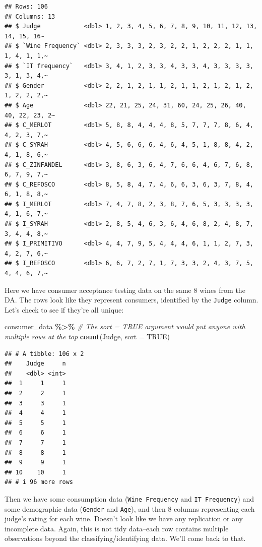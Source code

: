 \documentclass[
]{book}
\newenvironment{Shaded}{\begin{snugshade}}{\end{snugshade}}
\newcommand{\AttributeTok}[1]{\textcolor[rgb]{0.13,0.29,0.53}{#1}}
\newcommand{\CommentTok}[1]{\textcolor[rgb]{0.56,0.35,0.01}{\textit{#1}}}
\newcommand{\ConstantTok}[1]{\textcolor[rgb]{0.56,0.35,0.01}{#1}}
\newcommand{\FunctionTok}[1]{\textcolor[rgb]{0.13,0.29,0.53}{\textbf{#1}}}
\newcommand{\NormalTok}[1]{#1}
\newcommand{\SpecialCharTok}[1]{\textcolor[rgb]{0.81,0.36,0.00}{\textbf{#1}}}
\begin{document}
\begin{verbatim}
## Rows: 106
## Columns: 13
## $ Judge            <dbl> 1, 2, 3, 4, 5, 6, 7, 8, 9, 10, 11, 12, 13, 14, 15, 16~
## $ `Wine Frequency` <dbl> 2, 3, 3, 3, 2, 3, 2, 2, 1, 2, 2, 2, 1, 1, 1, 4, 1, 1,~
## $ `IT frequency`   <dbl> 3, 4, 1, 2, 3, 3, 4, 3, 3, 4, 3, 3, 3, 3, 3, 1, 3, 4,~
## $ Gender           <dbl> 2, 2, 1, 2, 1, 1, 2, 1, 1, 2, 1, 2, 1, 2, 1, 2, 2, 2,~
## $ Age              <dbl> 22, 21, 25, 24, 31, 60, 24, 25, 26, 40, 40, 22, 23, 2~
## $ C_MERLOT         <dbl> 5, 8, 8, 4, 4, 4, 8, 5, 7, 7, 7, 8, 6, 4, 4, 2, 3, 7,~
## $ C_SYRAH          <dbl> 4, 5, 6, 6, 6, 4, 6, 4, 5, 1, 8, 8, 4, 2, 4, 1, 8, 6,~
## $ C_ZINFANDEL      <dbl> 3, 8, 6, 3, 6, 4, 7, 6, 6, 4, 6, 7, 6, 8, 6, 7, 9, 7,~
## $ C_REFOSCO        <dbl> 8, 5, 8, 4, 7, 4, 6, 6, 3, 6, 3, 7, 8, 4, 6, 1, 8, 8,~
## $ I_MERLOT         <dbl> 7, 4, 7, 8, 2, 3, 8, 7, 6, 5, 3, 3, 3, 3, 4, 1, 6, 7,~
## $ I_SYRAH          <dbl> 2, 8, 5, 4, 6, 3, 6, 4, 6, 8, 2, 4, 8, 7, 3, 4, 4, 8,~
## $ I_PRIMITIVO      <dbl> 4, 4, 7, 9, 5, 4, 4, 4, 6, 1, 1, 2, 7, 3, 4, 2, 7, 6,~
## $ I_REFOSCO        <dbl> 6, 6, 7, 2, 7, 1, 7, 3, 3, 2, 4, 3, 7, 5, 4, 4, 6, 7,~
\end{verbatim}

Here we have consumer acceptance testing data on the same 8 wines from the DA. The rows look like they represent consumers, identified by the \texttt{Judge} column. Let's check to see if they're all unique:

\begin{Shaded}
\begin{Highlighting}[]
\NormalTok{consumer\_data }\SpecialCharTok{\%\textgreater{}\%}
\CommentTok{\# The sort = TRUE argument would put anyone with multiple rows at the top}
  \FunctionTok{count}\NormalTok{(Judge, }\AttributeTok{sort =} \ConstantTok{TRUE}\NormalTok{)}
\end{Highlighting}
\end{Shaded}

\begin{verbatim}
## # A tibble: 106 x 2
##    Judge     n
##    <dbl> <int>
##  1     1     1
##  2     2     1
##  3     3     1
##  4     4     1
##  5     5     1
##  6     6     1
##  7     7     1
##  8     8     1
##  9     9     1
## 10    10     1
## # i 96 more rows
\end{verbatim}

Then we have some consumption data (\texttt{Wine\ Frequency} and \texttt{IT\ Frequency}) and some demographic data (\texttt{Gender} and \texttt{Age}), and then 8 columns representing each judge's rating for each wine. Doesn't look like we have any replication or any incomplete data. Again, this is not tidy data--each row contains multiple observations beyond the classifying/identifying data. We'll come back to that.
\end{document}
